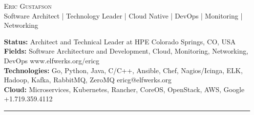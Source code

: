 \documentclass[10pt]{article}
\newcommand{\metasection}[2]
{
\footnotesize{#2} \hspace*{\fill} \footnotesize{#1}\\[1pt]
}
\begin{document}
\pagestyle{fancy}








\vspace{-8pt}
\begin{center}
	\HUGE \textsc{Eric Gustafson}
          \\[4pt]
	\small Software Architect | Technology Leader | Cloud Native | DevOps | Monitoring | Networking
\end{center}



\vspace{6pt}


\metasection{Colorado Springs, CO, USA}
            {\textbf{Status:} Architect and Technical Leader at HPE}
\metasection{www.elfwerks.org/ericg}
            {\textbf{Fields:} Software Architecture and Development,
              Cloud, Monitoring, Networking, DevOps}
\metasection{ericg@elfwerks.org}
            {\textbf{Technologies:} Go, Python, Java, C/C++, Ansible,
              Chef, Nagios/Icinga, ELK, Hadoop, Kafka, RabbitMQ, ZeroMQ}
\metasection{+1.719.359.4112}
            {\textbf{Cloud:} Microservices, Kubernetes, Rancher,
              CoreOS, OpenStack, AWS, Google} 
\vspace{-2pt}
\textcolor{softcol}{\hrule}
\vspace{6pt}

\normalsize
\end{document}
